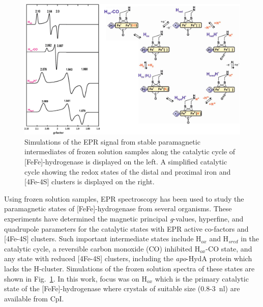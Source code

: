 \begin{figure}[htbp]
\centering
 \includegraphics[width=\textwidth]{Kapitel/end-images/Ch6-EPRCat.eps}
 \caption[EPR Signals along the catalytic cycle of FeFe-Hydrogenase.]{Simulations of the EPR signal from stable paramagnetic intermediates of frozen solution samples along the catalytic cycle of [FeFe]-hydrogenase is displayed on the left. A simplified catalytic cycle showing the redox states of the distal and proximal iron and [4Fe-4S] clusters is displayed on the right.} 
 \label{fig:FeFeCatCycle}
\end{figure}

Using frozen solution samples, EPR spectroscopy has been used to study the paramagnetic states of [FeFe]-hydrogenase from several organisms. \cite{lubitzhyd,Silakov57Fe,Adamska2015pdt,Adamska2015} These experiments have determined the magnetic principal \textit{g}-values, hyperfine, and quadrupole parameters for the catalytic states with EPR active co-factors and [4Fe-4S] clusters. Such important intermediate states include H$_{ox}$ and H$_{sred}$ in the catalytic cycle, a reversible carbon monoxide (CO) inhibited H$_{ox}$-CO state, and any state with reduced [4Fe-4S] clusters, including the \textit{apo}-HydA protein which lacks the H-cluster. Simulations of the frozen solution spectra of these states are shown in Fig.~\ref{fig:FeFeCatCycle}. In this work, focus was on H$_{ox}$ which is the primary catalytic state of the [FeFe]-hydrogenase where crystals of suitable size (0.8-3~nl) are available from CpI.

